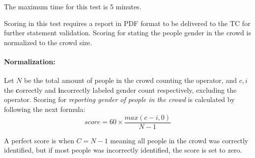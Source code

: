 The maximum time for this test is 5 minutes.

Scoring in this test requires a report in PDF format to be delivered to the TC for further statement validation. Scoring for stating the people gender in the crowd is normalized to the crowd size. 

\begin{scorelist}

\end{scorelist}

\paragraph{Normalization:}
Let $N$ be the total amount of people in the crowd counting the operator, and $c, i$  the \textbf{c}orrectly and \textbf{i}ncorrectly labeled gender count respectively, excluding the operator. Scoring for \textit{reporting gender of people in the crowd} is calculated by following the next formula:
$$score = 60 \times \frac{max(c - i, 0)}{N-1}$$

A perfect score is when $C = N-1$ meaning all people in the crowd was correctly identified, but if most people was incorrectly identified, the score is set to zero.

\vspace*{\fill}~
